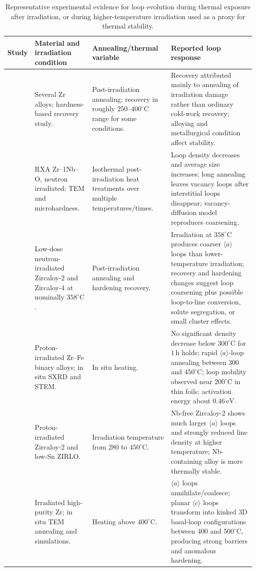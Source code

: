 \documentclass[11pt]{article}
\newcommand{\degreeC}{^\circ\mathrm{C}}
\begin{document}
\begin{table}[htbp]
\centering
\caption{Representative experimental evidence for loop evolution during thermal exposure after irradiation, or during higher-temperature irradiation used as a proxy for thermal stability.}
\label{tab:survey}
\begin{tabularx}{\textwidth}{p{}p{}p{}Y}
\toprule
Study & Material and irradiation condition & Annealing/thermal variable & Reported loop response \\
\midrule
\citet{HoweThomas1974} & Several Zr alloys; hardness-based recovery study. & Post-irradiation annealing; recovery in roughly $250$--$400\degreeC$ range for some conditions. & Recovery attributed mainly to annealing of irradiation damage rather than ordinary cold-work recovery; alloying and metallurgical condition affect stability. \\
\citet{Ribis2008,Ribis2010} & RXA Zr--1Nb--O, neutron irradiated; TEM and microhardness. & Isothermal post-irradiation heat treatments over multiple temperatures/times. & Loop density decreases and average size increases; long annealing leaves vacancy loops after interstitial loops disappear; vacancy-diffusion model reproduces coarsening. \\
\citet{Francis2015} & Low-dose neutron-irradiated Zircaloy-2 and Zircaloy-4 at nominally $358\degreeC$. & Post-irradiation annealing and hardening recovery. & Irradiation at $358\degreeC$ produces coarser $\langle a\rangle$ loops than lower-temperature irradiation; recovery and hardening changes suggest loop coarsening plus possible loop-to-line conversion, solute segregation, or small cluster effects. \\
\citet{Topping2018} & Proton-irradiated Zr--Fe binary alloys; in situ SXRD and STEM. & In situ heating. & No significant density decrease below $300\degreeC$ for $1\,\mathrm{h}$ holds; rapid $\langle a\rangle$-loop annealing between $300$ and $450\degreeC$; loop mobility observed near $200\degreeC$ in thin foils; activation energy about $0.46\,\mathrm{eV}$. \\
\citet{Harte2017} & Proton-irradiated Zircaloy-2 and low-Sn ZIRLO. & Irradiation temperature from $280$ to $450\degreeC$. & Nb-free Zircaloy-2 shows much larger $\langle a\rangle$ loops and strongly reduced line density at higher temperature; Nb-containing alloy is more thermally stable. \\
\citet{Liu2025} & Irradiated high-purity Zr; in situ TEM annealing and simulations. & Heating above $400\degreeC$. & $\langle a\rangle$ loops annihilate/coalesce; planar $\langle c\rangle$ loops transform into kinked 3D basal-loop configurations between $400$ and $500\degreeC$, producing strong barriers and anomalous hardening. \\
\bottomrule
\end{tabularx}
\end{table}
\end{document}
